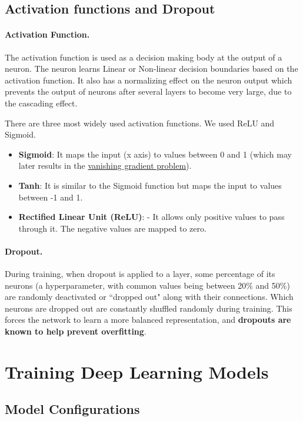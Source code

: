 \documentclass[11pt]{article}
\begin{document}
\subsection{Activation functions and Dropout}

\paragraph*{Activation Function.}  
  The activation function is used as a decision making body at the output of a neuron. The neuron learns Linear or Non-linear decision boundaries based on the activation function.
%
It also has a normalizing effect on the neuron output which prevents the output of neurons after several layers to become very large, due to the cascading effect.  

%
There are three most widely used activation functions. We used ReLU and Sigmoid.
\begin{itemize}
\item \textbf{Sigmoid}: It maps the input (x axis) to values between 0 and 1 (which may later results in the \href{https://towardsdatascience.com/the-vanishing-gradient-problem-69bf08b15484}{vanishing gradient problem}).
\item \textbf{Tanh}: It is similar to the Sigmoid function but maps the input to values between -1 and 1.
\item \textbf{Rectified Linear Unit (ReLU)}: - It allows only positive values to pass through it. The negative values are mapped to zero.
\end{itemize}

\paragraph*{Dropout.}
 During training, when dropout is applied to a layer, some percentage of its neurons (a hyperparameter, with common values being between 20\% and 50\%) are randomly deactivated or ``dropped out" along with their connections. Which neurons are dropped out are constantly shuffled randomly during training. This forces the network to learn a more balanced representation, and \textbf{dropouts are known to help prevent overfitting}.

\section{Training Deep Learning Models}
\label{Training Deep Learning Models}

\subsection{Model Configurations}
\end{document}
